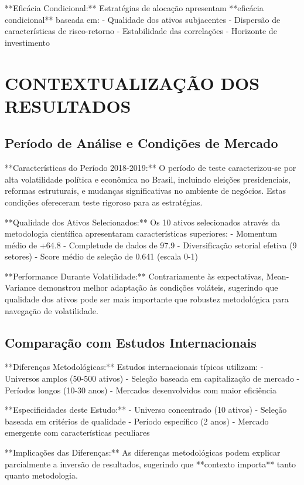 **Eficácia Condicional:** Estratégias de alocação apresentam **eficácia condicional** baseada em:
- Qualidade dos ativos subjacentes
- Dispersão de características de risco-retorno
- Estabilidade das correlações
- Horizonte de investimento

\section{CONTEXTUALIZAÇÃO DOS RESULTADOS}

\subsection{Período de Análise e Condições de Mercado}

**Características do Período 2018-2019:** O período de teste caracterizou-se por alta volatilidade política e econômica no Brasil, incluindo eleições presidenciais, reformas estruturais, e mudanças significativas no ambiente de negócios. Estas condições ofereceram teste rigoroso para as estratégias.

**Qualidade dos Ativos Selecionados:** Os 10 ativos selecionados através da metodologia científica apresentaram características superiores:
- Momentum médio de +64.8%
- Completude de dados de 97.9%
- Diversificação setorial efetiva (9 setores)
- Score médio de seleção de 0.641 (escala 0-1)

**Performance Durante Volatilidade:** Contrariamente às expectativas, Mean-Variance demonstrou melhor adaptação às condições voláteis, sugerindo que qualidade dos ativos pode ser mais importante que robustez metodológica para navegação de volatilidade.

\subsection{Comparação com Estudos Internacionais}

**Diferenças Metodológicas:** Estudos internacionais típicos utilizam:
- Universos amplos (50-500 ativos)
- Seleção baseada em capitalização de mercado
- Períodos longos (10-30 anos)
- Mercados desenvolvidos com maior eficiência

**Especificidades deste Estudo:**
- Universo concentrado (10 ativos)
- Seleção baseada em critérios de qualidade
- Período específico (2 anos)
- Mercado emergente com características peculiares

**Implicações das Diferenças:** As diferenças metodológicas podem explicar parcialmente a inversão de resultados, sugerindo que **contexto importa** tanto quanto metodologia.


